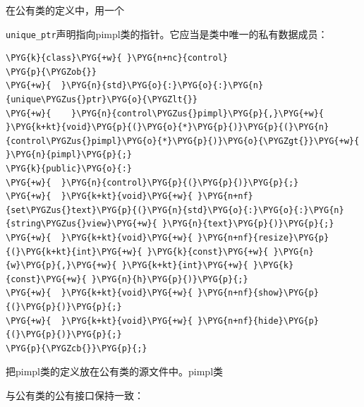 
在公有类的定义中，用一个



\texttt{unique\_\allowbreak{}ptr}声明指向pimpl类的指针。它应当是类中唯一的私有数据成员：



\begin{codeblockbg}
\begin{Verbatim}[commandchars=\\\{\},breaklines=true,breakanywhere=true,fontsize=\codefont,xleftmargin=17bp]
\PYG{k}{class}\PYG{+w}{ }\PYG{n+nc}{control}
\PYG{p}{\PYGZob{}}
\PYG{+w}{  }\PYG{n}{std}\PYG{o}{:}\PYG{o}{:}\PYG{n}{unique\PYGZus{}ptr}\PYG{o}{\PYGZlt{}}
\PYG{+w}{    }\PYG{n}{control\PYGZus{}pimpl}\PYG{p}{,}\PYG{+w}{ }\PYG{k+kt}{void}\PYG{p}{(}\PYG{o}{*}\PYG{p}{)}\PYG{p}{(}\PYG{n}{control\PYGZus{}pimpl}\PYG{o}{*}\PYG{p}{)}\PYG{o}{\PYGZgt{}}\PYG{+w}{ }\PYG{n}{pimpl}\PYG{p}{;}
\PYG{k}{public}\PYG{o}{:}
\PYG{+w}{  }\PYG{n}{control}\PYG{p}{(}\PYG{p}{)}\PYG{p}{;}
\PYG{+w}{  }\PYG{k+kt}{void}\PYG{+w}{ }\PYG{n+nf}{set\PYGZus{}text}\PYG{p}{(}\PYG{n}{std}\PYG{o}{:}\PYG{o}{:}\PYG{n}{string\PYGZus{}view}\PYG{+w}{ }\PYG{n}{text}\PYG{p}{)}\PYG{p}{;}
\PYG{+w}{  }\PYG{k+kt}{void}\PYG{+w}{ }\PYG{n+nf}{resize}\PYG{p}{(}\PYG{k+kt}{int}\PYG{+w}{ }\PYG{k}{const}\PYG{+w}{ }\PYG{n}{w}\PYG{p}{,}\PYG{+w}{ }\PYG{k+kt}{int}\PYG{+w}{ }\PYG{k}{const}\PYG{+w}{ }\PYG{n}{h}\PYG{p}{)}\PYG{p}{;}
\PYG{+w}{  }\PYG{k+kt}{void}\PYG{+w}{ }\PYG{n+nf}{show}\PYG{p}{(}\PYG{p}{)}\PYG{p}{;}
\PYG{+w}{  }\PYG{k+kt}{void}\PYG{+w}{ }\PYG{n+nf}{hide}\PYG{p}{(}\PYG{p}{)}\PYG{p}{;}
\PYG{p}{\PYGZcb{}}\PYG{p}{;}
\end{Verbatim}
\end{codeblockbg}



把pimpl类的定义放在公有类的源文件中。pimpl类



与公有类的公有接口保持一致：



